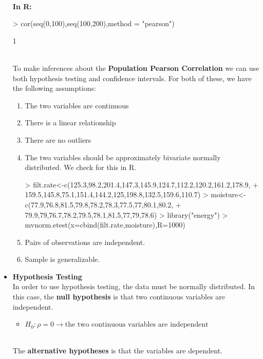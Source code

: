 \documentclass{article}
\begin{document}
\begin{itemize}
        \\ \textbf{In R:}
\begin{Schunk}
\begin{Sinput}
> cor(seq(0,100),seq(100,200),method = "pearson")
\end{Sinput}
\begin{Soutput}
[1] 1
\end{Soutput}
\end{Schunk}
        \\ To make inferences about the \textbf{Population Pearson Correlation} we can use both hypothesis testing and confidence intervals. For both of these, we have the following assumptions:
            \begin{enumerate}
              \item The two variables are continuous
              \item There is a linear relationship
              \item There are no outliers
              \item The two variables should be approximately bivariate normally distributed. We check for this in R.
\begin{Schunk}
\begin{Sinput}
> filt.rate<-c(125.3,98.2,201.4,147.3,145.9,124.7,112.2,120.2,161.2,178.9,
+              159.5,145.8,75.1,151.4,144.2,125,198.8,132.5,159.6,110.7)
> moisture<-c(77.9,76.8,81.5,79.8,78.2,78.3,77.5,77,80.1,80.2,
+             79.9,79,76.7,78.2,79.5,78.1,81.5,77,79,78.6)
> library("energy")
> mvnorm.etest(x=cbind(filt.rate,moisture),R=1000)
\end{Sinput}
\end{Schunk}
              \item Pairs of observations are independent.
              \item Sample is generalizable.
            \end{enumerate}
          \item \textbf{Hypothesis Testing}
            \\ In order to use hypothesis testing, the data must be normally distributed. In this case, the \textbf{null hypothesis} is that two continuous variables are independent.
            \begin{itemize}
              \item$H_0:\rho = 0 \rightarrow \text{the two continuous variables are independent}$
            \end{itemize}
            \\ The \textbf{alternative hypotheses} is that the variables are dependent.

\end{itemize}
\end{document}
